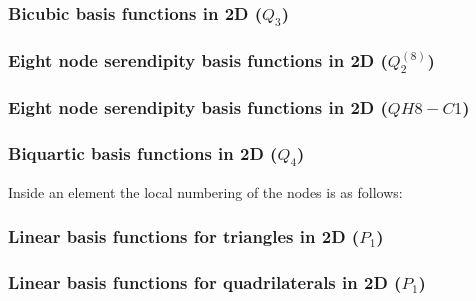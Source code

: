 \subsubsection{Bicubic basis functions in 2D ($Q_3$) \label{ss:q32d}}



\subsubsection{Eight node serendipity basis functions in 2D ($Q_2^{(8)}$)}
\label{sec:serendipity2D}



\subsubsection{Eight node serendipity basis functions in 2D ($QH8-C1$)}
\label{sec:serendipity2Db}
 



\subsubsection{Biquartic basis functions in 2D ($Q_4$)}

Inside an element the local numbering of the nodes is as follows:



\subsubsection{Linear basis functions for triangles in 2D ($P_1$)}\label{ss:p1}



\subsubsection{Linear basis functions for quadrilaterals in 2D ($P_1$)}\label{ss:lbfq2D}

